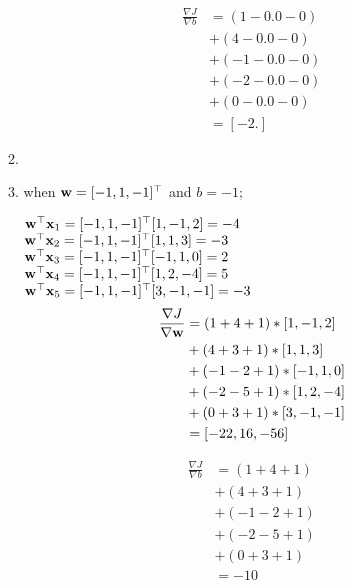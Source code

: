 \documentclass[12pt, fullpage,letterpaper]{article}
\begin{document}
\begin{enumerate}
\begin{enumerate}
\begin{align*}
    \frac{\nabla J}{\nabla b} &=
    (1 - 0.0 - 0)\\
    &+ (4 - 0.0 - 0)\\
    &+ (-1 - 0.0 - 0)\\
    &+ (-2 - 0.0 - 0)\\
    &+ (0 - 0.0 - 0)\\
    &= [-2.]
\end{align*}\item

%
%
%
%
%
%



\item when ${\bf w} = [-1,1,-1]^\top$ and $b = -1$;

${\bf w}^\top {\bf x}_1 = [-1, 1, -1]^\top[1, -1, 2]  = -4$\\
${\bf w}^\top {\bf x}_2 = [-1, 1, -1]^\top[1, 1, 3]   = -3$\\
${\bf w}^\top {\bf x}_3 = [-1, 1, -1]^\top[-1, 1, 0]  = 2 $\\
${\bf w}^\top {\bf x}_4 = [-1, 1, -1]^\top[1, 2, -4]  = 5 $\\
${\bf w}^\top {\bf x}_5 = [-1, 1, -1]^\top[3, -1, -1] = -3$ \\

\begin{align*}
    \frac{\nabla J}{\nabla {\bf w}} &=
    (1 + 4 + 1) * [1,-1,2]\\
    &+ (4 + 3 + 1) * [1,1,3]\\
    &+ (-1 - 2 + 1) * [-1,1,0]\\
    &+ (-2 - 5 + 1) * [1,2,-4]\\
    &+ (0 + 3 + 1) * [3,-1,-1]\\
    &= [-22,  16, -56]
\end{align*}

\begin{align*}
    \frac{\nabla J}{\nabla b} &=
    (1 + 4 + 1)\\
    &+ (4 + 3 + 1)\\
    &+ (-1 - 2 + 1)\\
    &+ (-2 - 5 + 1)\\
    &+ (0 + 3 + 1)\\
    &= -10 %
\end{align*}


\end{enumerate}
\end{enumerate}
\end{document}
